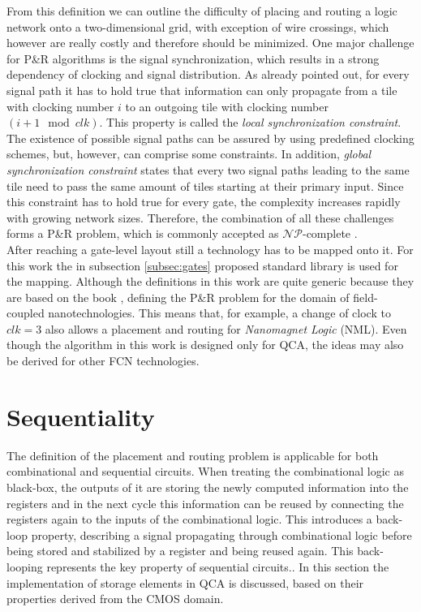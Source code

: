 From this definition we can outline the difficulty of placing and routing a logic network onto a two-dimensional grid, with exception of wire crossings, which however are really costly and therefore should be minimized. One major challenge for P\&R algorithms is the signal synchronization, which results in a strong dependency of clocking and signal distribution. As already pointed out, for every signal path it has to hold true that information can only propagate from a tile with clocking number $i$ to an outgoing tile with clocking number $(i+1 \mod clk)$. This property is called the \textit{local synchronization constraint}. The existence of possible signal paths can be assured by using predefined clocking schemes, but, however, can comprise some constraints. In addition, \textit{global synchronization constraint} states that every two signal paths leading to the same tile need to pass the same amount of tiles starting at their primary input. Since this constraint has to hold true for every gate, the complexity increases rapidly with growing network sizes. Therefore, the combination of all these challenges forms a P\&R problem, which is commonly accepted as $\mathcal{NP}$-complete \cite{NP-hard}. \\
After reaching a gate-level layout still a technology has to be mapped onto it. For this work the in subsection \ref{subsec:gates} proposed standard library is used for the mapping. Although the definitions in this work are quite generic because they are based on the book \cite{Walter}, defining the P\&R problem for the domain of field-coupled nanotechnologies. This means that, for example, a change of clock to $clk = 3$ also allows a placement and routing for \textit{Nanomagnet Logic} (NML). Even though the algorithm in this work is designed only for QCA, the ideas may also be derived for other FCN technologies.

\section{Sequentiality}\label{subsec:latchesandregisters}

The definition of the placement and routing problem is applicable for both combinational and sequential circuits. When treating the combinational logic as black-box, the outputs of it are storing the newly computed information into the registers and in the next cycle this information can be reused by connecting the registers again to the inputs of the combinational logic. This introduces a back-loop property, describing a signal propagating through combinational logic before being stored and stabilized by a register and being reused again. This back-looping represents the key property of sequential circuits.. In this section the implementation of storage elements in QCA is discussed, based on their properties derived from the CMOS domain.

